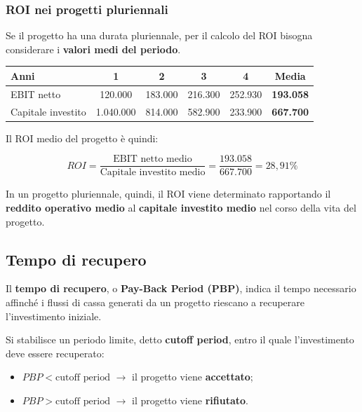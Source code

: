 \subsubsection*{ROI nei progetti pluriennali}

\noindent Se il progetto ha una durata pluriennale, per il calcolo del ROI bisogna considerare i \textbf{valori medi del periodo}.

\begin{center}
\begin{tabular}{|l|c|c|c|c|c|}
\hline
\textbf{Anni} & \textbf{1} & \textbf{2} & \textbf{3} & \textbf{4} & \textbf{Media} \\
\hline
EBIT netto & 
120.000 & 
183.000 & 
216.300 & 
252.930 & 
\textbf{193.058} \\
\hline
Capitale investito & 
1.040.000 & 
814.000 & 
582.900 & 
233.900 & 
\textbf{667.700} \\
\hline
\end{tabular}
\end{center}

\noindent Il ROI medio del progetto è quindi:

\[
ROI
=
\frac{\text{EBIT netto medio}}
{\text{Capitale investito medio}}
=
\frac{193.058}{667.700}
=
\boxed{28{,}91\%}
\]

\noindent In un progetto pluriennale, quindi, il ROI viene determinato rapportando il \textbf{reddito operativo medio} al \textbf{capitale investito medio} nel corso della vita del progetto.
\subsection{Tempo di recupero}

\noindent Il \textbf{tempo di recupero}, o \textbf{Pay-Back Period (PBP)}, indica il tempo 
necessario affinché i flussi di cassa generati da un progetto riescano a recuperare l'investimento iniziale.

\medskip

\noindent Si stabilisce un periodo limite, detto \textbf{cutoff period}, entro il quale 
l'investimento deve essere recuperato:

\begin{itemize}
    \item $PBP < \text{cutoff period}$ $\rightarrow$ il progetto viene \textbf{accettato};
    \item $PBP > \text{cutoff period}$ $\rightarrow$ il progetto viene \textbf{rifiutato}.
\end{itemize}

